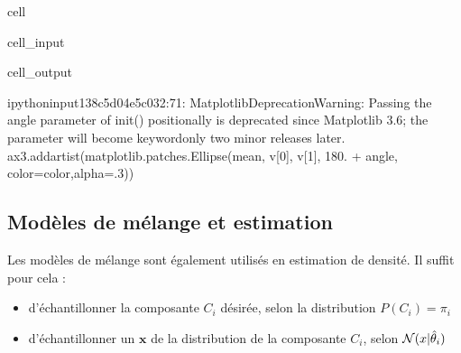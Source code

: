 \documentclass[letterpaper,10pt,french]{sphinxmanual}
\begin{document}
\begin{sphinxuseclass}{cell}
\begin{sphinxuseclass}{cell_input}
\begin{sphinxVerbatim}[commandchars=\\\{\}]
     
 
\end{sphinxVerbatim}

\end{sphinxuseclass}
\begin{sphinxuseclass}{cell_output}
\begin{sphinxVerbatim}[commandchars=\\\{\}]
\PYGZlt{}ipython\PYGZhy{}input\PYGZhy{}13\PYGZhy{}8c5d04e5c032\PYGZgt{}:71: MatplotlibDeprecationWarning: Passing the angle parameter of \PYGZus{}\PYGZus{}init\PYGZus{}\PYGZus{}() positionally is deprecated since Matplotlib 3.6; the parameter will become keyword\PYGZhy{}only two minor releases later.
  ax3.add\PYGZus{}artist(matplotlib.patches.Ellipse(mean, v[0], v[1], 180. + angle, color=color,alpha=.3))
\end{sphinxVerbatim}

\noindent{}

\end{sphinxuseclass}
\end{sphinxuseclass}

\subsection{Modèles de mélange et estimation}
\label{\detokenize{clustering:modeles-de-melange-et-estimation}}
\sphinxAtStartPar
Les modèles de mélange sont également utilisés en estimation de densité. Il suffit pour cela :
\begin{itemize}
\item {} 
\sphinxAtStartPar
d’échantillonner la composante \(C_i\) désirée, selon la distribution \(P(C_i)=\pi_i\)

\item {} 
\sphinxAtStartPar
d’échantillonner un \(\mathbf x\) de la distribution de la composante \(C_i\), selon \({\cal N}(x|\hat{\theta}_i)\)

\end{itemize}
\end{document}
